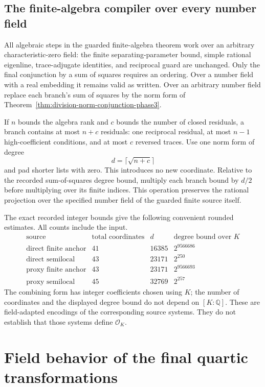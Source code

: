 \documentclass[11pt]{article}
\theoremstyle{definition}
\begin{document}
\subsection{The finite-algebra compiler over every number field}

All algebraic steps in the guarded finite-algebra theorem work
over an arbitrary characteristic-zero field: the finite
separating-parameter bound, simple rational eigenline,
trace-adjugate identities, and reciprocal guard are unchanged.
Only the final conjunction by a sum of squares requires an
ordering.  Over a number field with a real embedding it remains
valid as written.  Over an arbitrary number field replace each
branch's sum of squares by the norm form of
Theorem~\ref{thm:division-norm-conjunction-phase3}.

If $n$ bounds the algebra rank and $c$ bounds the number of
closed residuals, a branch contains at most $n+c$ residuals:
one reciprocal residual, at most $n-1$ high-coefficient
conditions, and at most $c$ reversed traces.  Use one norm form
of degree
\[
                         d=\lceil\sqrt{n+c}\rceil
\]
and pad shorter lists with zero.  This introduces no new
coordinate.  Relative to the recorded sum-of-squares degree
bound, multiply each branch bound by $d/2$ before multiplying
over its finite indices.  This operation preserves the rational
projection over the specified number field of the guarded
finite source itself.

The exact recorded integer bounds give the following convenient
rounded estimates.  All counts include the input.
\[
\begin{array}{c|c|r|c}
\text{source}&\text{total coordinates}&d&\text{degree bound over }K\\\hline
\text{direct finite anchor}&41&16385&2^{9566686}\\
\text{direct semilocal}&43&23171&2^{250}\\
\text{proxy finite anchor}&43&23171&2^{9566693}\\
\text{proxy semilocal}&45&32769&2^{257}
\end{array}
\]
The combining form has integer coefficients chosen using $K$;
the number of coordinates and the displayed degree bound do not
depend on $[K:\mathbb Q]$.  These are field-adapted encodings
of the corresponding source systems.  They do not establish
that those systems define $\mathcal O_K$.


\section{Field behavior of the final quartic transformations}
\label{sec:final-quartic-fields-v2}
\end{document}
